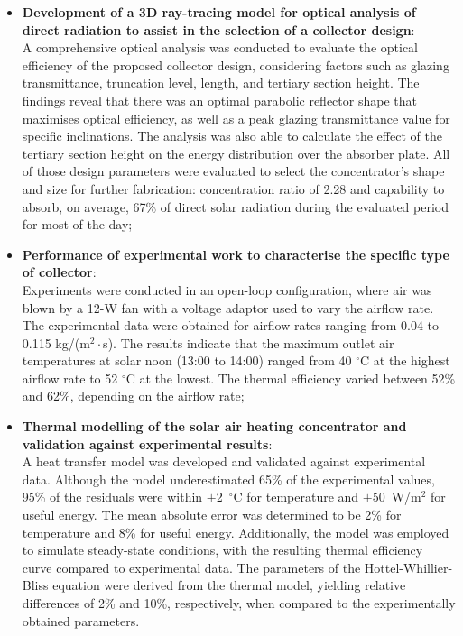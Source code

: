 \begin{itemize}
	\item \textbf{Development of a 3D ray-tracing model for optical analysis of direct radiation to assist in the selection of a collector design}: \\
	A comprehensive optical analysis was conducted to evaluate the optical efficiency of the proposed collector design, considering factors such as glazing transmittance, truncation level, length, and tertiary section height. The findings reveal that there was an optimal parabolic reflector shape that maximises optical efficiency, as well as a peak glazing transmittance value for specific inclinations. The analysis was also able to calculate the effect of the tertiary section height on the energy distribution over the absorber plate. All of those design parameters were evaluated to select the concentrator's shape and size for further fabrication: concentration ratio of 2.28 and capability to absorb, on average, 67\% of direct solar radiation during the evaluated period for most of the day;
	
	\item \textbf{Performance of experimental work to characterise the specific type of collector}: \\
	Experiments were conducted in an open-loop configuration, where air was blown by a 12-W fan with a voltage adaptor used to vary the airflow rate. The experimental data were obtained for airflow rates ranging from 0.04 to 0.115 kg/(m$^2\cdot$s). The results indicate that the maximum outlet air temperatures at solar noon (13:00 to 14:00) ranged from 40 $^{\circ}$C at the highest airflow rate to 52 $^{\circ}$C at the lowest. The thermal efficiency varied between 52\% and 62\%, depending on the airflow rate;
	
	\item \textbf{Thermal modelling of the solar air heating concentrator and validation against experimental results}: \\
	A heat transfer model was developed and validated against experimental data. Although the model underestimated 65\% of the experimental values, 95\% of the residuals were within $\pm$2~$^{\circ}$C for temperature and $\pm$50~W/m$^2$ for useful energy. The mean absolute error was determined to be 2\% for temperature and 8\% for useful energy. Additionally, the model was employed to simulate steady-state conditions, with the resulting thermal efficiency curve compared to experimental data. The parameters of the Hottel-Whillier-Bliss equation were derived from the thermal model, yielding relative differences of 2\% and 10\%, respectively, when compared to the experimentally obtained parameters.
	

\end{itemize}
